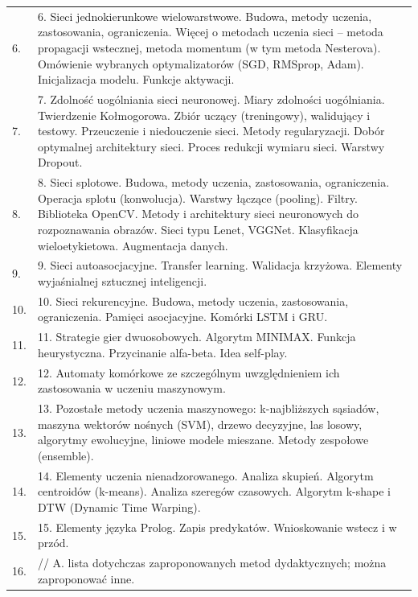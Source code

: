 \documentclass[12pt, a4paper]{article}
\begin{document}
{\begin{longtable}{m{1.5cm}m{14.5cm}}
  \rowcolor{tableRowAlt} 6. & 6. Sieci jednokierunkowe wielowarstwowe. Budowa, metody uczenia, zastosowania, ograniczenia. Więcej o metodach uczenia sieci – metoda propagacji wstecznej, metoda momentum (w tym metoda Nesterova). Omówienie wybranych optymalizatorów (SGD, RMSprop, Adam). Inicjalizacja modelu. Funkcje aktywacji. \\
  \rowcolor{tableRowLight} 7. & 7.  Zdolność uogólniania sieci neuronowej. Miary zdolności uogólniania. Twierdzenie Kołmogorowa. Zbiór uczący (treningowy), walidujący i testowy. Przeuczenie i niedouczenie sieci. Metody regularyzacji. Dobór optymalnej architektury sieci. Proces redukcji wymiaru sieci. Warstwy Dropout. \\
  \rowcolor{tableRowAlt} 8. & 8. Sieci splotowe. Budowa, metody uczenia, zastosowania, ograniczenia. Operacja splotu (konwolucja). Warstwy łączące (pooling). Filtry.  Biblioteka OpenCV. Metody i architektury sieci neuronowych do rozpoznawania obrazów. Sieci typu Lenet, VGGNet. Klasyfikacja wieloetykietowa. Augmentacja danych. \\
  \rowcolor{tableRowLight} 9. & 9. Sieci autoasocjacyjne. Transfer learning. Walidacja krzyżowa. Elementy wyjaśnialnej sztucznej inteligencji. \\
  \rowcolor{tableRowAlt} 10. & 10. Sieci rekurencyjne. Budowa, metody uczenia, zastosowania, ograniczenia. Pamięci asocjacyjne. Komórki LSTM i GRU. \\
  \rowcolor{tableRowLight} 11. & 11. Strategie gier dwuosobowych. Algorytm MINIMAX.  Funkcja heurystyczna. Przycinanie alfa-beta. Idea self-play. \\
  \rowcolor{tableRowAlt} 12. & 12. Automaty komórkowe ze szczególnym uwzględnieniem ich zastosowania w uczeniu maszynowym. \\
  \rowcolor{tableRowLight} 13. & 13. Pozostałe metody uczenia maszynowego: k-najbliższych sąsiadów, maszyna wektorów nośnych (SVM), drzewo decyzyjne, las losowy, algorytmy ewolucyjne, liniowe modele mieszane. Metody zespołowe (ensemble). \\
  \rowcolor{tableRowAlt} 14. & 14. Elementy uczenia nienadzorowanego. Analiza skupień. Algorytm centroidów (k-means). Analiza szeregów czasowych. Algorytm k-shape i DTW (Dynamic Time Warping). \\
  \rowcolor{tableRowLight} 15. & 15. Elementy języka Prolog. Zapis predykatów. Wnioskowanie wstecz i w przód. \\
  \rowcolor{tableRowAlt} 16. & // A. lista dotychczas zaproponowanych metod dydaktycznych; można zaproponować inne. \\

\end{longtable}}
\end{document}
